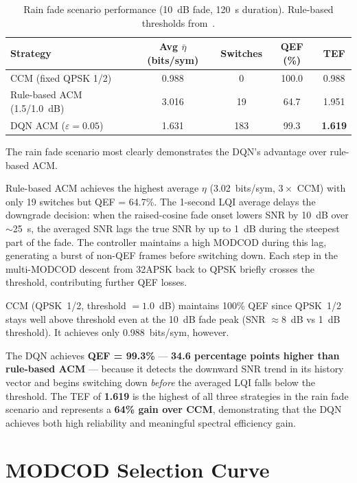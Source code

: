 \documentclass[12pt,a4paper]{report}
\begin{document}
\begin{table}[H]
\centering
\caption{Rain fade scenario performance (10~dB fade, 120~s duration).
  Rule-based thresholds from~\cite{bischl2010}.}
\label{tab:perf_rain}
\begin{tabular}{lcccc}
\toprule
\textbf{Strategy} & \textbf{Avg $\bar{\eta}$ (bits/sym)} &
\textbf{Switches} & \textbf{QEF (\%)} & \textbf{TEF} \\
\midrule
CCM (fixed QPSK 1/2)         & 0.988 &   0 & 100.0 & 0.988 \\
Rule-based ACM (1.5/1.0~dB)  & 3.016 &  19 &  64.7 & 1.951 \\
DQN ACM ($\varepsilon=0.05$) & 1.631 & 183 &  99.3 & \textbf{1.619} \\
\bottomrule
\end{tabular}
\end{table}

The rain fade scenario most clearly demonstrates the DQN's advantage over
rule-based ACM.

Rule-based ACM achieves the highest average $\eta$ (3.02~bits/sym, $3\times$
CCM) with only 19 switches but QEF = 64.7\%.  The 1-second LQI average delays
the downgrade decision: when the raised-cosine fade onset lowers SNR by 10~dB
over $\sim$25~s, the averaged SNR lags the true SNR by up to 1~dB during the
steepest part of the fade.  The controller maintains a high MODCOD during this
lag, generating a burst of non-QEF frames before switching down.  Each step in
the multi-MODCOD descent from 32APSK back to QPSK briefly crosses the
threshold, contributing further QEF losses.

CCM (QPSK~1/2, threshold $= 1.0$~dB) maintains 100\% QEF since QPSK~1/2 stays
well above threshold even at the 10~dB fade peak (SNR $\approx 8$~dB vs 1~dB
threshold).  It achieves only 0.988~bits/sym, however.

The DQN achieves \textbf{QEF = 99.3\%} --- \textbf{34.6 percentage points
higher than rule-based ACM} --- because it detects the downward SNR trend in
its history vector and begins switching down \emph{before} the averaged LQI
falls below the threshold.  The TEF of \textbf{1.619} is the highest of all
three strategies in the rain fade scenario and represents a \textbf{64\% gain
over CCM}, demonstrating that the DQN achieves both high reliability and
meaningful spectral efficiency gain.

\section{MODCOD Selection Curve}
\label{sec:modcod_curve}
\end{document}
